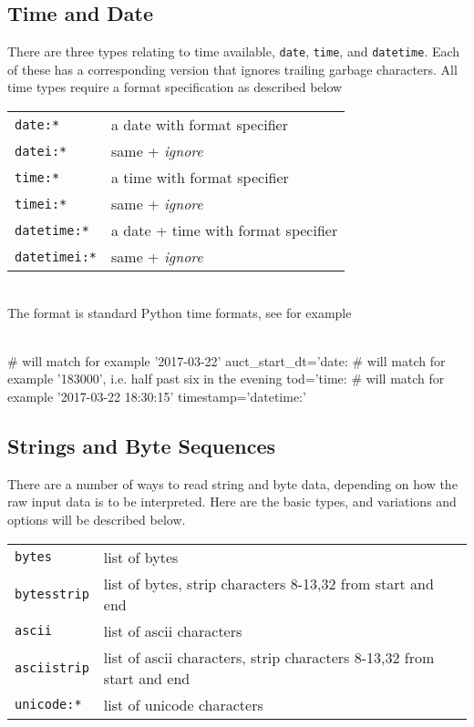 \subsection{Time and Date}
There are three types relating to time available, \texttt{date},
\texttt{time}, and \texttt{datetime}.  Each of these has a
corresponding version that ignores trailing garbage characters.
All time types require a format specification as described below\\

\begin{tabular}{ll}
  \texttt{date:*}      & a date with format specifier\\
  \texttt{datei:*}     & same + \emph{ignore}\\
  \texttt{time:*}      & a time with format specifier\\
  \texttt{timei:*}     & same + \emph{ignore}\\
  \texttt{datetime:*}  & a date + time with format specifier\\
  \texttt{datetimei:*} & same + \emph{ignore}\\
\end{tabular}\\

The format is standard Python time formats, see for example\\
\\
\begin{python}
   # will match for example '2017-03-22'
   auct_start_dt='date:%
   # will match for example '183000', i.e. half past six in the evening
   tod='time:%
   # will match for example '2017-03-22 18:30:15'
   timestamp='datetime:'%
\end{python}


\subsection{Strings and Byte Sequences}
There are a number of ways to read string and byte data, depending on
how the raw input data is to be interpreted.  Here are the basic
types, and variations and options will be described below.\\

\begin{tabular}{ll}
  \texttt{bytes}      & list of bytes\\
  \texttt{bytesstrip} & list of bytes, strip characters 8-13,32 from start and end\\
  \texttt{ascii}      & list of ascii characters\\
  \texttt{asciistrip} & list of ascii characters, strip characters 8-13,32 from start and end\\
  \texttt{unicode:*}    & list of unicode characters\\
\end{tabular}\\

